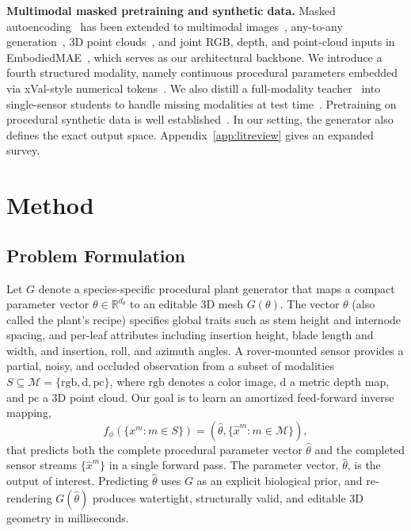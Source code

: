 \documentclass[10pt,twocolumn,letterpaper]{article}
\providecommand{\R}{\mathbb{R}}
\begin{document}
\noindent\textbf{Multimodal masked pretraining and synthetic data.}
Masked autoencoding~\citep{he2022mae} has been extended to multimodal images~\citep{bachmann2022multimae}, any-to-any generation~\citep{mizrahi2023fourm,bachmann2024fourm21}, 3D point clouds~\citep{pang2022pointmae}, and joint RGB, depth, and point-cloud inputs in EmbodiedMAE~\citep{dong2025embodiedmae}, which serves as our architectural backbone. We introduce a fourth structured modality, namely continuous procedural parameters embedded via xVal-style numerical tokens~\citep{golkar2023xval}. We also distill a full-modality teacher~\citep{hinton2015distillation} into single-sensor students to handle missing modalities at test time~\citep{wang2024robustmissing}. Pretraining on procedural synthetic data is well established~\citep{kataoka2020fractaldb,raistrick2023infinigen,greff2022kubric,tobin2017domainrand,fan2023intriguing}. In our setting, the generator also defines the exact output space. Appendix~\ref{app:litreview} gives an expanded survey.

\section{Method}
\label{sec:method}

\subsection{Problem Formulation}
\label{sec:method-form}

Let $G$ denote a species-specific procedural plant generator that maps a compact parameter vector $\theta \in \R^{d_\theta}$ to an editable 3D mesh $G(\theta)$. The vector $\theta$ (also called the plant's recipe) specifies global traits such as stem height and internode spacing, and per-leaf attributes including insertion height, blade length and width, and insertion, roll, and azimuth angles. A rover-mounted sensor provides a partial, noisy, and occluded observation from a subset of modalities $S \subseteq \mathcal{M} = \{\mathrm{rgb}, \mathrm{d}, \mathrm{pc}\}$, where $\mathrm{rgb}$ denotes a color image, $\mathrm{d}$ a metric depth map, and $\mathrm{pc}$ a 3D point cloud. Our goal is to learn an amortized feed-forward inverse mapping,
\begin{equation}
  f_\phi\!\left(\{x^m : m \in S\}\right)
  = \left(\hat\theta, \{\hat x^m : m \in \mathcal{M}\}\right),
  \label{eq:procedural-inverse}
\end{equation}
that predicts both the complete procedural parameter vector $\hat\theta$ and the completed sensor streams $\{\hat x^m\}$ in a single forward pass. The parameter vector, $\hat\theta$, is the output of interest. Predicting $\hat\theta$ uses $G$ as an explicit biological prior, and re-rendering $G(\hat\theta)$ produces watertight, structurally valid, and editable 3D geometry in milliseconds.
\end{document}
